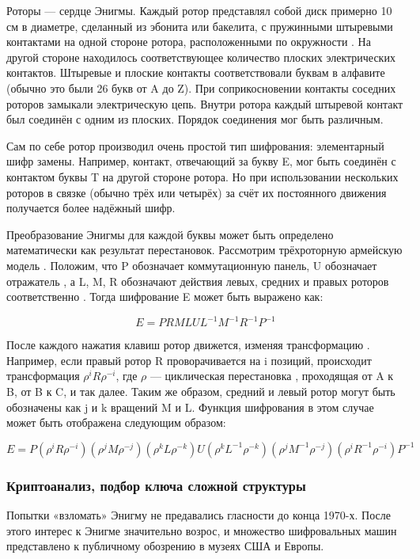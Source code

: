 Роторы — сердце Энигмы. Каждый ротор представлял собой диск примерно 
10 см в диаметре, сделанный из эбонита или бакелита, с пружинными 
штыревыми контактами на одной стороне ротора, расположенными по окружности
. На другой стороне находилось соответствующее количество плоских 
электрических контактов. Штыревые и плоские контакты соответствовали 
буквам в алфавите (обычно это были 26 букв от A до Z). При соприкосновении 
контакты соседних роторов замыкали электрическую цепь. Внутри ротора 
каждый штыревой контакт был соединён с одним из плоских. Порядок соединения 
мог быть различным.

Сам по себе ротор производил очень простой тип шифрования: элементарный 
шифр замены. Например, контакт, отвечающий за букву E, мог быть соединён 
с контактом буквы T на другой стороне ротора. Но при использовании 
нескольких роторов в связке (обычно трёх или четырёх) за счёт их постоянного 
движения получается более надёжный шифр.

Преобразование Энигмы для каждой буквы может быть определено математически 
как результат перестановок. Рассмотрим трёхроторную армейскую модель
. Положим, что P обозначает коммутационную панель, U обозначает отражатель
, а L, M, R обозначают действия левых, средних и правых роторов соответственно
. Тогда шифрование E может быть выражено как:

    $$E = PRMLUL^{-1}M^{-1}R^{-1}P^{-1}$$

После каждого нажатия клавиш ротор движется, изменяя трансформацию
. Например, если правый ротор R проворачивается на i позиций, происходит 
трансформация $\rho^iR\rho^{-i}$, где $\rho$ — циклическая перестановка
, проходящая от A к B, от B к C, и так далее. Таким же образом, средний 
и левый ротор могут быть обозначены как j и k вращений M и L. Функция 
шифрования в этом случае может быть отображена следующим образом:

    $$E = P(\rho^iR\rho^{-i})(\rho^{j}M\rho^{-j})(\rho^{k}L\rho^{-k})U(\rho^kL^{-1}\rho^{-k})(\rho^{j}M^{-1}\rho^{-j})(\rho^{i}R^{-1}\rho^{-i})P^{-1}$$

\subsubsection{Криптоанализ, подбор ключа сложной структуры}
Попытки «взломать» Энигму не предавались гласности до конца 1970-х.
После этого интерес к Энигме значительно возрос, и множество шифровальных 
машин представлено к публичному обозрению в музеях США и Европы.

